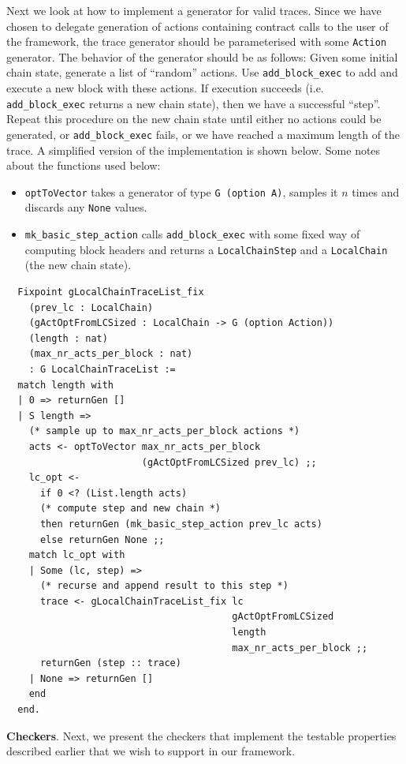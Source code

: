 \documentclass[twoside,11pt,openright]{report}
\newenvironment{code}{\captionsetup{type=figure, singlelinecheck=off, justification=raggedleft}}{}
\newcommand{\coq}[1]{\texttt{#1}}
\begin{document}
Next we look at how to implement a generator for valid traces. Since we have chosen to delegate generation of actions containing contract calls to the user of the framework, the trace generator should be parameterised with some \coq{Action} generator. The behavior of the generator should be as follows: Given some initial chain state, generate a list of ``random'' actions. Use \coq{add\_block\_exec} to add and execute a new block with these actions. If execution succeeds (i.e. \coq{add\_block\_exec} returns a new chain state), then we have a successful ``step''. Repeat this procedure on the new chain state until either no actions could be generated, or \coq{add\_block\_exec} fails, or we have reached a maximum length of the trace. A simplified version of the implementation is shown below. Some notes about the functions used below:
\begin{itemize}
    \item \coq{optToVector} takes a generator of type \coq{G (option A)}, samples it $n$ times and discards any \coq{None} values.
    \item \coq{mk\_basic\_step\_action} calls \coq{add\_block\_exec} with some fixed way of computing block headers and returns a \coq{LocalChainStep} and a \coq{LocalChain} (the new chain state). 
\end{itemize}
\begin{code}
\label{def:gLocalChainTraceList_fix}
\begin{verbatim}
  Fixpoint gLocalChainTraceList_fix 
    (prev_lc : LocalChain)
    (gActOptFromLCSized : LocalChain -> G (option Action))
    (length : nat)
    (max_nr_acts_per_block : nat) 
    : G LocalChainTraceList :=
  match length with
  | 0 => returnGen []
  | S length => 
    (* sample up to max_nr_acts_per_block actions *)
    acts <- optToVector max_nr_acts_per_block 
                        (gActOptFromLCSized prev_lc) ;;
    lc_opt <- 
      if 0 <? (List.length acts)
      (* compute step and new chain *)
      then returnGen (mk_basic_step_action prev_lc acts)
      else returnGen None ;;
    match lc_opt with
    | Some (lc, step) => 
      (* recurse and append result to this step *)  
      trace <- gLocalChainTraceList_fix lc 
                                        gActOptFromLCSized 
                                        length 
                                        max_nr_acts_per_block ;;
      returnGen (step :: trace)
    | None => returnGen []
    end
  end.
\end{verbatim}
\end{code}
\textbf{Checkers}. Next, we present the checkers that implement the testable properties described earlier that we wish to support in our framework. 
\end{document}
